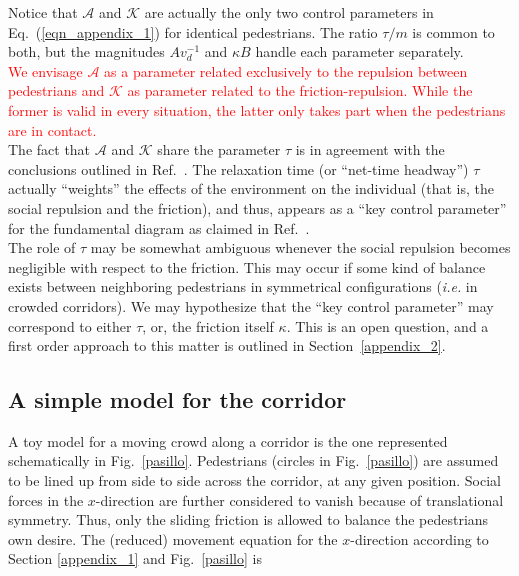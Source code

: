 \documentclass[preprint,12pt]{elsarticle}
\begin{document}
Notice that $\mathcal{A}$ and $\mathcal{K}$ are actually the only two 
control parameters in Eq.~(\ref{eqn_appendix_1}) for identical 
pedestrians. The ratio $\tau/m$ is common to both, but the magnitudes 
$Av_d^{-1}$ and $\kappa B$ handle each parameter separately.\\

\textcolor{red}{We envisage $\mathcal{A}$ as a parameter related exclusively to the 
repulsion between pedestrians and $\mathcal{K}$  as parameter related to the friction-repulsion.
While the former is valid in every situation, the latter only takes part when the
pedestrians are in contact.}\\

The fact that $\mathcal{A}$ and $\mathcal{K}$ share the parameter $\tau$ is 
in agreement with the conclusions outlined in Ref.~\cite{johansson}. The 
relaxation time (or ``net-time headway'') $\tau$ actually ``weights'' the 
effects of the environment on the individual (that is, the social repulsion and 
the friction), and thus, appears as a ``key control parameter'' for the 
fundamental diagram as claimed in Ref.~\cite{johansson}.\\

The role of $\tau$ may be somewhat ambiguous whenever the social 
repulsion becomes negligible with respect to the friction. This may occur if 
some kind of balance exists between neighboring pedestrians in 
symmetrical configurations (\textit{i.e.} in crowded corridors). We may 
hypothesize that the ``key control parameter'' may correspond to either 
$\tau$, or, the friction itself $\kappa$. This is an open question, and a 
first order approach to this matter is outlined in Section~\ref{appendix_2}.\\


\subsection{\label{appendix_2}A simple model for the corridor}

A toy model for a moving crowd along a corridor is the one represented 
schematically in Fig.~\ref{pasillo}. Pedestrians (circles in 
Fig.~\ref{pasillo}) 
are assumed to be lined up from side to side across the corridor, at any given 
position. Social forces in the $x$-direction are further considered to vanish 
because of translational symmetry. Thus, only the sliding friction is allowed 
to balance the pedestrians own desire. The (reduced) movement equation for 
the $x$-direction according to Section \ref{appendix_1} and Fig.~\ref{pasillo} 
is  
\end{document}
